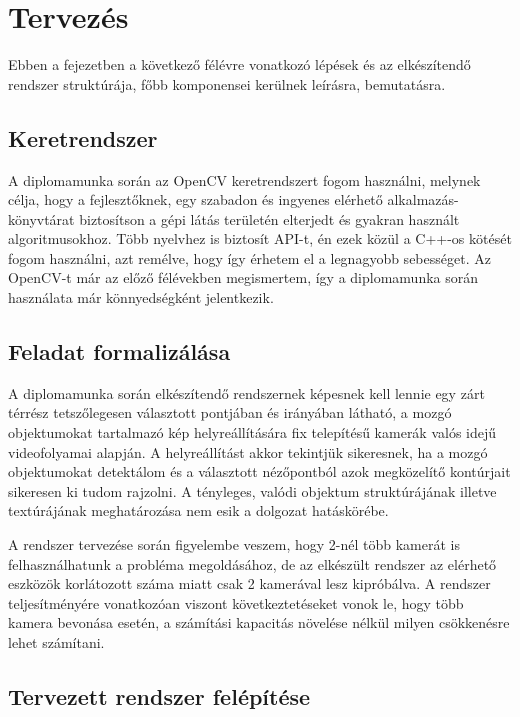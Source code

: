 \chapter{Tervezés}

Ebben a fejezetben a következő félévre vonatkozó lépések és az elkészítendő rendszer struktúrája, főbb komponensei kerülnek leírásra, bemutatásra.

\section{Keretrendszer}

A diplomamunka során az OpenCV \cite{opencv} keretrendszert fogom használni, melynek célja, hogy a fejlesztőknek, egy szabadon és ingyenes elérhető alkalmazás-könyvtárat biztosítson a gépi látás területén elterjedt és gyakran használt algoritmusokhoz. Több nyelvhez is biztosít API-t, én ezek közül a C++-os kötését fogom használni, azt remélve, hogy így érhetem el a legnagyobb sebességet. Az OpenCV-t már az előző félévekben megismertem, így a diplomamunka során használata már könnyedségként jelentkezik.

\section{Feladat formalizálása}

A diplomamunka során elkészítendő rendszernek képesnek kell lennie egy zárt térrész tetszőlegesen választott pontjában és irányában látható, a mozgó objektumokat tartalmazó kép helyreállítására fix telepítésű kamerák valós idejű videofolyamai alapján. A helyreállítást akkor tekintjük sikeresnek, ha a mozgó objektumokat detektálom és a választott nézőpontból azok megközelítő kontúrjait sikeresen ki tudom rajzolni. A tényleges, valódi objektum struktúrájának illetve textúrájának meghatározása nem esik a dolgozat hatáskörébe.

A rendszer tervezése során figyelembe veszem, hogy 2-nél több kamerát is felhasználhatunk a probléma megoldásához, de az elkészült rendszer az elérhető eszközök korlátozott száma miatt csak 2 kamerával lesz kipróbálva. A rendszer teljesítményére vonatkozóan viszont következtetéseket vonok le, hogy több kamera bevonása esetén, a számítási kapacitás növelése nélkül milyen csökkenésre lehet számítani.

\section{Tervezett rendszer felépítése}

